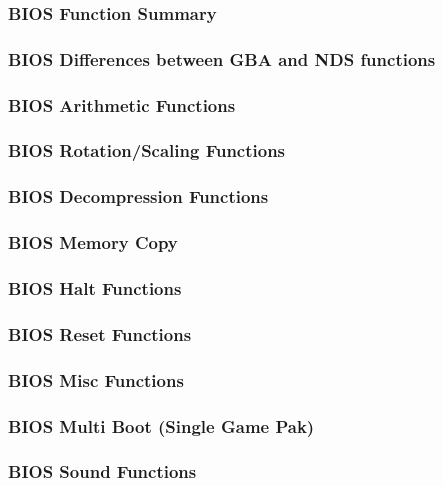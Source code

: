 \documentclass[11pt,a4paper]{proc}
\begin{document}
\begin{flushleft}
\subsubsection{BIOS Function Summary}

\subsubsection{BIOS Differences between GBA and NDS functions}

\subsubsection{BIOS Arithmetic Functions}

\subsubsection{BIOS Rotation/Scaling Functions}

\subsubsection{BIOS Decompression Functions}

\subsubsection{BIOS Memory Copy}

\subsubsection{BIOS Halt Functions}

\subsubsection{BIOS Reset Functions}

\subsubsection{BIOS Misc Functions}

\subsubsection{BIOS Multi Boot (Single Game Pak)}

\subsubsection{BIOS Sound Functions}


\end{flushleft}
\end{document}
